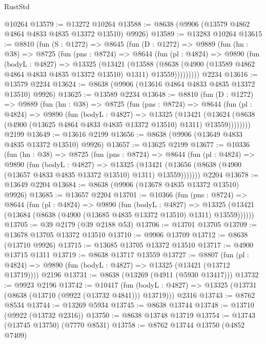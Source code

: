\begin{lexlean}{RustStd}
\begin{coremodule}
    @10264
@13579 := @13272 @10264
@13588 := @8638 (@9906 (@13579 @4862 @4864 @4833 @4835 @13372 @13510) @9926)
@13589 := @13283 @10264
@13615 := @8810
    (fun (S : @1272) =>
    @8645
      (fun (D : @1272) =>
      @9889
        (fun (hn : @38) =>
        @8725
          (fun (pns : @8724) =>
          @8644
            (fun (pl : @4824) =>
            @9890
              (fun (bodyL : @4827) =>
              @13325
                (@13421
                  (@13588
                    (@8638
                      (@4900 (@13589 @4862 @4864 @4833 @4835 @13372 @13510) @1311)
                      @13559)))))))))
    @2234
@13616 := @13579 @2234
@13624 := @8638 (@9906 (@13616 @4864 @4833 @4835 @13372 @13510) @9926)
@13625 := @13589 @2234
@13648 := @8810
    (fun (D : @1272) =>
    @9889
      (fun (hn : @38) =>
      @8725
        (fun (pns : @8724) =>
        @8644
          (fun (pl : @4824) =>
          @9890
            (fun (bodyL : @4827) =>
            @13325
              (@13421
                (@13624 (@8638 (@4900 (@13625 @4864 @4833 @4835 @13372 @13510) @1311) @13559))))))))
    @2199
@13649 := @13616 @2199
@13656 := @8638 (@9906 (@13649 @4833 @4835 @13372 @13510) @9926)
@13657 := @13625 @2199
@13677 := @10336
    (fun (hn : @38) =>
    @8725
      (fun (pns : @8724) =>
      @8644
        (fun (pl : @4824) =>
        @9890
          (fun (bodyL : @4827) =>
          @13325
            (@13421 (@13656 (@8638 (@4900 (@13657 @4833 @4835 @13372 @13510) @1311) @13559)))))))
    @2204
@13678 := @13649 @2204
@13684 := @8638 (@9906 (@13678 @4835 @13372 @13510) @9926)
@13685 := @13657 @2204
@13701 := @10366
    (fun (pns : @8724) =>
    @8644
      (fun (pl : @4824) =>
      @9890
        (fun (bodyL : @4827) =>
        @13325 (@13421 (@13684 (@8638 (@4900 (@13685 @4835 @13372 @13510) @1311) @13559))))))
@13705 := @39 @2179 (@39 @2188 @53)
@13706 := @13701 @13705
@13709 := @13678 @13705 @13372 @13510
@13710 := @9906 @13709
@13712 := @8638 (@13710 @9926)
@13715 := @13685 @13705 @13372 @13510
@13717 := @4900 @13715 @1311
@13719 := @8638 @13717 @13559
@13727 := @8807
    (fun (pl : @4824) => @9890 (fun (bodyL : @4827) => @13325 (@13421 (@13712 @13719))))
    @2196
@13731 := @8638 (@13269 (@4911 (@5930 @13417)))
@13732 := @9923 @2196
@13742 := @10417
    (fun (bodyL : @4827) => @13325 (@13731 (@8638 (@13710 (@9922 (@13732 @4841))) @13719)))
    @2316
@13743 := @8762 @8534
@13744 := @13269 @5934
@13745 := @8638 @13744
@13748 := @13710 (@9922 (@13732 @2316))
@13750 := @8638 @13748 @13719
@13754 := @13743 (@13745 @13750) (@7770 @8531)
@13758 := @8762 @13744 @13750 (@4852 @7409)

\end{coremodule}
\end{lexlean}
